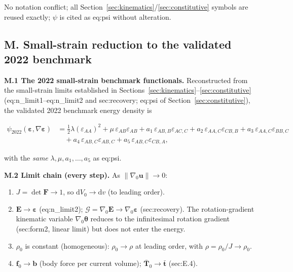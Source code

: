 \documentclass[11pt]{article}
\begin{document}
No notation conflict; all Section~\ref{sec:kinematics}/\ref{sec:constitutive} symbols are reused exactly; $\psi$ is cited as eq:psi without alteration. \checkmark

\subsection{M. Small-strain reduction to the validated 2022 benchmark}

\textbf{M.1 The 2022 small-strain benchmark functionals.} Reconstructed from the small-strain limits established in Sections~\ref{sec:kinematics}--\ref{sec:constitutive} (eq:n\_limit1--eq:n\_limit2 and sec:recovery; eq:psi of Section~\ref{sec:constitutive}), the validated 2022 benchmark energy density is

\begin{align}
\psi_{2022}(\boldsymbol{\varepsilon},\nabla\boldsymbol{\varepsilon})
&= \tfrac12\lambda(\varepsilon_{AA})^{2}
   +\mu\,\varepsilon_{AB}\varepsilon_{AB}
   + a_{1}\,\varepsilon_{AB,B}\varepsilon_{AC,C}
   + a_{2}\,\varepsilon_{AA,C}\varepsilon_{CB,B}
   + a_{3}\,\varepsilon_{AA,C}\varepsilon_{BB,C}
\nonumber\\
&\quad
   + a_{4}\,\varepsilon_{AB,C}\varepsilon_{AB,C}
   + a_{5}\,\varepsilon_{AB,C}\varepsilon_{CB,A},
\label{rn:psi2022}
\end{align}

with the \emph{same} $\lambda,\mu,a_1,\ldots,a_5$ as eq:psi.

\textbf{M.2 Limit chain (every step).} As $\|\nabla_{0}\mathbf{u}\|\to0$:

\begin{enumerate}
\item $J=\det\mathbf{F}\to 1$, so $\mathrm{d}V_{0}\to\mathrm{d}v$ (to leading order).

\item $\mathbf{E}\to\boldsymbol{\varepsilon}$ (eq:n\_limit2); $\bm{\mathcal{G}}=\nabla_{0}\mathbf{E}\to\nabla_{0}\boldsymbol{\varepsilon}$ (sec:recovery). The rotation-gradient kinematic variable $\nabla_{0}\boldsymbol{\theta}$ reduces to the infinitesimal rotation gradient (sec:form2, linear limit) but does not enter the energy.

\item $\rho_{0}$ is constant (homogeneous): $\rho_{0}\to\rho$ at leading order, with $\rho=\rho_{0}/J\to\rho_{0}$.

\item $\mathbf{f}_{0}\to\mathbf{b}$ (body force per current volume); $\bar{\mathbf{T}}_{0}\to\bar{\mathbf{t}}$ (sec:E.4).
\end{enumerate}
\end{document}
